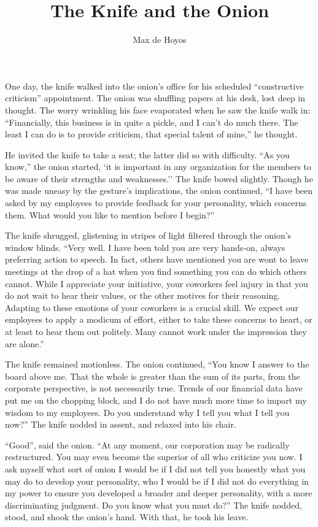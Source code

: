 \documentclass[12pt]{article}
\author{Max de Hoyos}
\title{The Knife and the Onion}
\begin{document}
\maketitle


One day, the knife walked into the onion's office for his scheduled ``constructive criticism'' appointment. The onion was shuffling papers at his desk, lost deep in thought. The worry wrinkling his face evaporated when he saw the knife walk in: ``Financially, this business is in quite a pickle, and I can't do much there. The least I can do is to provide criticism, that special talent of mine,'' he thought. 

He invited the knife to take a seat; the latter did so with difficulty. ``As you know,'' the onion started, `it is important in any organization for the members to be aware of their strengths and weaknesses.'' The knife bowed slightly. Though he was made uneasy by the gesture's implications, the onion continued, ``I have been asked by my employees to provide feedback for your personality, which concerns them. What would you like to mention before I begin?'' 

The knife shrugged, glistening in stripes of light filtered through the onion's window blinds. ``Very well. I have been told you are very hands-on, always preferring action to speech. In fact, others have mentioned you are wont to leave meetings at the drop of a hat when you find something you can do which others cannot. While I appreciate your initiative, your coworkers feel injury in that you do not wait to hear their values, or the other motives for their reasoning. Adapting to these emotions of your coworkers is a crucial skill. We expect our employees to apply a modicum of effort, either to take these concerns to heart, or at least to hear them out politely. Many cannot work under the impression they are alone.'' 

The knife remained motionless. The onion continued, ``You know I answer to the board above me. That the whole is greater than the sum of its parts, from the corporate perspective, is not necessarily true. Trends of our financial data have put me on the chopping block, and I do not have much more time to impart my wisdom to my employees. Do you understand why I tell you what I tell you now?'' The knife nodded in assent, and relaxed into his chair. 

``Good'', said the onion. ``At any moment, our corporation may be radically restructured. You may even become the superior of all who criticize you now. I ask myself what sort of onion I would be if I did not tell you honestly what you may do to develop your personality, who I would be if I did not do everything in my power to ensure you developed a broader and deeper personality, with a more discriminating judgment. Do you know what you must do?'' The knife nodded, stood, and shook the onion's hand. With that, he took his leave.
\end{document}
